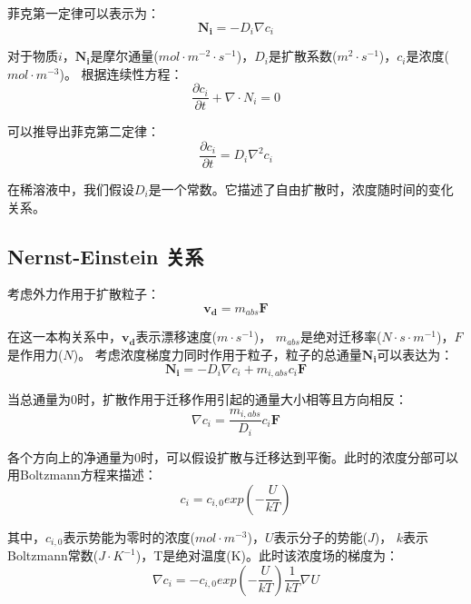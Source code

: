 菲克第一定律可以表示为：
\begin{equation}
    \mathbf{N_i}=-D_i\nabla{c_i}
\end{equation}

对于物质$i$，$\mathbf{N_i}$是摩尔通量($mol\cdot{m^{-2}\cdot{s^{-1}}}$)，$D_i$是扩散系数($m^2\cdot{s^{-1}}$)，$c_i$是浓度($mol\cdot{m^{-3}}$)。
根据连续性方程：
\begin{equation}
    \frac{\partial c_i}{\partial t}+\nabla\cdot{N_i}=0
\end{equation}

可以推导出菲克第二定律：
\begin{equation}
    \frac{\partial c_i}{\partial t}=D_i\nabla^2{c_i}
\end{equation}

在稀溶液中，我们假设$D_i$是一个常数。它描述了自由扩散时，浓度随时间的变化关系。\cite{Sakaguchi2018} 
\subsection{Nernst-Einstein 关系}
考虑外力作用于扩散粒子：
\begin{equation}
    \mathbf{v_d}=m_{abs}\mathbf{F}
\end{equation}

在这一本构关系中，$\mathbf{v_d}$表示漂移速度($m\cdot{s^{-1}}$)，
$m_{abs}$是绝对迁移率($N\cdot{s\cdot{m^{-1}}}$)，$F$是作用力($N$)。
考虑浓度梯度力同时作用于粒子，粒子的总通量$\mathbf{N_i}$可以表达为：
\begin{equation}
    \mathbf{N_i}=-D_i\nabla{c_i}+m_{i,abs}c_i\mathbf{F}
\end{equation}

当总通量为$0$时，扩散作用于迁移作用引起的通量大小相等且方向相反：
\begin{equation}
    \nabla{c_i}=\frac{m_{i,abs}}{D_i}c_i\mathbf{F}
\end{equation}

各个方向上的净通量为$0$时，可以假设扩散与迁移达到平衡。此时的浓度分部可以用Boltzmann方程来描述：
\begin{equation}
    c_i=c_{i,0}exp(-\frac{U}{kT})
\end{equation}

其中，$c_{i,0}$表示势能为零时的浓度($mol\cdot{m^{-3}}$)，$U$表示分子的势能($J$)，
$k$表示Boltzmann常数($J\cdot{K^{-1}}$)，T是绝对温度(K)。此时该浓度场的梯度为：
\begin{equation}
    \nabla{c_i}=-c_{i,0}exp(-\frac{U}{kT})\frac{1}{kT}\nabla{U}
\end{equation}

